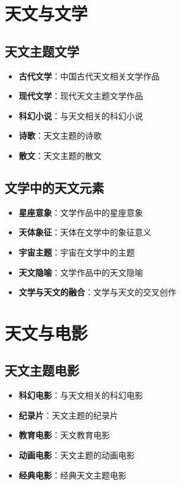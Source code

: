 \documentclass[12pt,UTF8]{ctexbook}
\begin{document}
\chapter{天文与文学}
\section{天文主题文学}

\begin{itemize}
  \item \textbf{古代文学}：中国古代天文相关文学作品
  \item \textbf{现代文学}：现代天文主题文学作品
  \item \textbf{科幻小说}：与天文相关的科幻小说
  \item \textbf{诗歌}：天文主题的诗歌
  \item \textbf{散文}：天文主题的散文
\end{itemize}

\section{文学中的天文元素}

\begin{itemize}
  \item \textbf{星座意象}：文学作品中的星座意象
  \item \textbf{天体象征}：天体在文学中的象征意义
  \item \textbf{宇宙主题}：宇宙在文学中的主题
  \item \textbf{天文隐喻}：文学作品中的天文隐喻
  \item \textbf{文学与天文的融合}：文学与天文的交叉创作
\end{itemize}

\chapter{天文与电影}
\section{天文主题电影}

\begin{itemize}
  \item \textbf{科幻电影}：与天文相关的科幻电影
  \item \textbf{纪录片}：天文主题的纪录片
  \item \textbf{教育电影}：天文教育电影
  \item \textbf{动画电影}：天文主题的动画电影
  \item \textbf{经典电影}：经典天文主题电影
\end{itemize}
\end{document}
